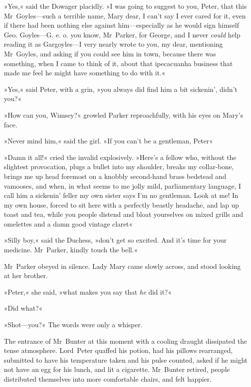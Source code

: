 »Yes,« said the Dowager placidly. »I was going to suggest to you, Peter, that this Mr~Goyles—such a terrible name, Mary dear, I can't say I ever cared for it, even if there had been nothing else against him—especially as he would sign himself Geo. Goyles—G. e. o. you know, Mr~Parker, for George, and I never \textit{could} help reading it as Gargoyles—I very nearly wrote to you, my dear, mentioning Mr~Goyles, and asking if you could see him in town, because there was something, when I came to think of it, about that ipecacuanha business that made me feel he might have something to do with it.«

»Yes,« said Peter, with a grin, »you always did find him a bit sickenin', didn't you?«

»How can you, Wimsey?« growled Parker reproachfully, with his eyes on Mary's face.

»Never mind him,« said the girl. »If you can't be a gentleman, Peter\longdash«

»Damn it all!« cried the invalid explosively. »Here's a fellow who, without the slightest provocation, plugs a bullet into my shoulder, breaks my collar-bone, brings me up head foremost on a knobbly second-hand brass bedstead and vamooses, and when, in what seems to me jolly mild, parliamentary language, I call him a sickenin' feller my own sister says I'm no gentleman. Look at me! In my own house, forced to sit here with a perfectly beastly headache, and lap up toast and tea, while you people distend and bloat yourselves on mixed grills and omelettes and a damn good vintage claret\longdash«

»Silly boy,« said the Duchess, »don't get so excited. And it's time for your medicine. Mr~Parker, kindly touch the bell.«

Mr~Parker obeyed in silence. Lady Mary came slowly across, and stood looking at her brother.

»Peter,« she said, »what makes you say that \textit{he} did it?«

»Did what?«

»Shot—you?« The words were only a whisper.

The entrance of Mr~Bunter at this moment with a cooling draught dissipated the tense atmosphere. Lord~Peter quaffed his potion, had his pillows rearranged, submitted to have his temperature taken and his pulse counted, asked if he might not have an egg for his lunch, and lit a cigarette. Mr~Bunter retired, people distributed themselves into more comfortable chairs, and felt happier.

